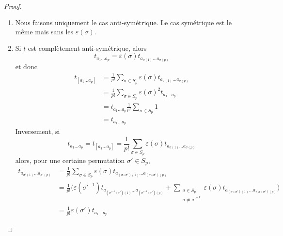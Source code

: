 \documentclass[a4paper,11pt]{report}
\begin{document}
                \begin{proof}${}$
                    \begin{enumerate}[label = \textit{\roman*)}]
                        \item Nous faisons uniquement le cas anti-symétrique. Le cas symétrique est le même mais sans les $\varepsilon(\sigma)$.
                        \item Si $t$ est complètement anti-symétrique, alors 
                        \begin{equation}
                            t_{a_1\dots a_p} = \varepsilon(\sigma)t_{a_{\sigma(1)}\dots a_{\sigma(p)}}
                        \end{equation}
                        et donc
                        \begin{align}
                            t_{[a_1\dots a_p]} &= \frac{1}{p!}\sum_{\sigma\in S_p}\varepsilon(\sigma) t_{a_{\sigma(1)}\dots a_{\sigma(p)}}\\
                            &= \frac{1}{p!}\sum_{\sigma\in S_p}\varepsilon(\sigma)^2 t_{a_1\dots a_p}\\
                            &= t_{a_1\dots a_p} \frac{1}{p!}\sum_{\sigma\in S_p}1\\
                            &= t_{a_1\dots a_p}
                        \end{align}
                        Inversement, si
                        \begin{equation}
                            t_{a_1\dots a_p} = t_{[a_1\dots a_p]}
                            = \frac{1}{p!}\sum_{\sigma\in S_p}\varepsilon(\sigma) t_{a_{\sigma(1)}\dots a_{\sigma(p)}}
                        \end{equation}
                        alors, pour une certaine permutation $\sigma'\in S_p$,
                        \begin{align}
                            t_{a_{\sigma'(1)}\dots a_{\sigma'(p)}} &=  \frac{1}{p!}\sum_{\sigma\in S_p}\varepsilon(\sigma) t_{a_{(\sigma\circ\sigma')(1)}\dots a_{(\sigma\circ\sigma')(p)}}\\
                            &= \frac{1}{p!}\bigg( \varepsilon(\sigma'^{-1}) t_{a_{(\sigma'^{-1}\circ\sigma')(1)}\dots a_{(\sigma'^{-1}\circ\sigma')(p)}}+\sum_{\substack{\sigma\in S_p\\\sigma\neq\sigma'^{-1}}} \varepsilon(\sigma) t_{a_{(\sigma\circ\sigma')(1)}\dots a_{(\sigma\circ\sigma')(p)}} \bigg)\\
                            &= \frac{1}{p!}  \varepsilon(\sigma')t_{a_1\dots a_p}

\end{align}
\end{enumerate}
\end{proof}
\end{document}
